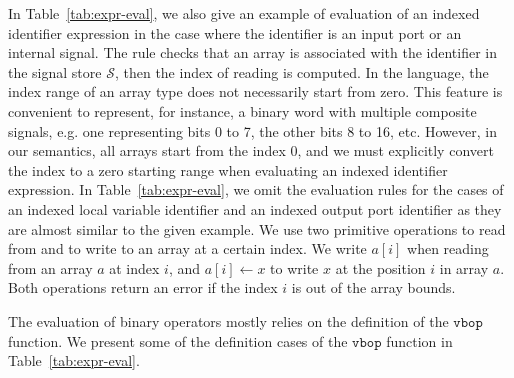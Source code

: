 \documentclass[pdflatex,sn-mathphys]{sn-jnl}%
\theoremstyle{thmstyleone}%
\theoremstyle{thmstyletwo}%
\theoremstyle{thmstylethree}%
\begin{document}
In Table~\ref{tab:expr-eval}, we also give an example of evaluation of
an indexed identifier expression in the case where the identifier is
an input port or an internal signal. The rule checks that an array is
associated with the identifier in the signal store $\mathcal{S}$, then
the index of reading is computed. In the \hvhdl{} language, the index
range of an array type does not necessarily start from zero. This
feature is convenient to represent, for instance, a binary word with
multiple composite signals, e.g. one representing bits 0 to 7, the
other bits 8 to 16, etc. However, in our semantics, all arrays start
from the index 0, and we must explicitly convert the index to a zero
starting range when evaluating an indexed identifier expression. In
Table~\ref{tab:expr-eval}, we omit the evaluation rules for the cases
of an indexed local variable identifier and an indexed output port
identifier as they are almost similar to the given example. We use two
primitive operations to read from and to write to an array at a
certain index. We write $a[i]$ when reading from an array $a$ at index
$i$, and $a[i]\leftarrow{}x$ to write $x$ at the position $i$ in array
$a$. Both operations return an error if the index $i$ is out of the
array bounds.

The evaluation of binary operators mostly relies on the definition of
the $\mathtt{vbop}$ function. We present some of the definition cases
of the $\mathtt{vbop}$ function in Table~\ref{tab:expr-eval}.
\end{document}
